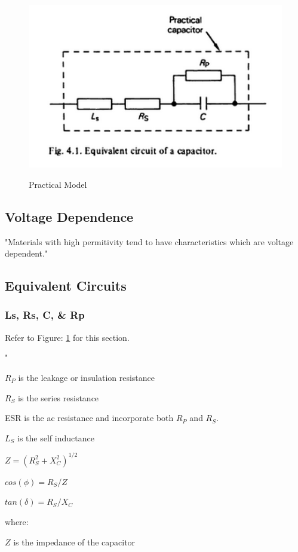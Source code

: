 \begin{figure}
    \includegraphics[keepaspectratio=true,scale=.7]{../figures/capModel_discComp.png}
    \centering
    \cite{disc_comp}
    \caption{Practical Model}
    \label{pracModel}
\end{figure}

\subsection{Voltage Dependence}

"Materials with high permitivity tend to have characteristics which are voltage dependent."\cite{disc_comp}

\subsection{Equivalent Circuits}
\subsubsection{Ls, Rs, C, \& Rp}

Refer to Figure: \ref{pracModel} for this section.

"

$R_P$ is the leakage or insulation resistance

$R_S$ is the series resistance

ESR is the ac resistance and incorporate both $R_P$ and $R_S$.

$L_S$ is the self inductance 

$Z = (R_S^2 + X_C^2)^{1/2}$

$cos(\phi) = R_S / Z$

$tan(\delta) = R_S / X_C$

where:

$Z$ is the impedance of the capacitor

